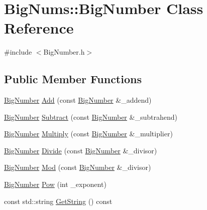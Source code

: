 \hypertarget{class_big_nums_1_1_big_number}{}\section{Big\+Nums\+::Big\+Number Class Reference}
\label{class_big_nums_1_1_big_number}


{\ttfamily \#include $<$Big\+Number.\+h$>$}

\subsection*{Public Member Functions}
\begin{DoxyCompactItemize}
\item 
\mbox{\hyperlink{class_big_nums_1_1_big_number}{Big\+Number}} \mbox{\hyperlink{class_big_nums_1_1_big_number_aead85993ce069442f7b15cca8c81df39}{Add}} (const \mbox{\hyperlink{class_big_nums_1_1_big_number}{Big\+Number}} \&\+\_\+addend)
\item 
\mbox{\hyperlink{class_big_nums_1_1_big_number}{Big\+Number}} \mbox{\hyperlink{class_big_nums_1_1_big_number_a505eed1769193372c05a1c41ae0e707b}{Subtract}} (const \mbox{\hyperlink{class_big_nums_1_1_big_number}{Big\+Number}} \&\+\_\+subtrahend)
\item 
\mbox{\hyperlink{class_big_nums_1_1_big_number}{Big\+Number}} \mbox{\hyperlink{class_big_nums_1_1_big_number_a7d54b0defb30727ab99a110b1b6c07ff}{Multiply}} (const \mbox{\hyperlink{class_big_nums_1_1_big_number}{Big\+Number}} \&\+\_\+multiplier)
\item 
\mbox{\hyperlink{class_big_nums_1_1_big_number}{Big\+Number}} \mbox{\hyperlink{class_big_nums_1_1_big_number_a55f83d787d248c55d9df8347c2fcb7ed}{Divide}} (const \mbox{\hyperlink{class_big_nums_1_1_big_number}{Big\+Number}} \&\+\_\+divisor)
\item 
\mbox{\hyperlink{class_big_nums_1_1_big_number}{Big\+Number}} \mbox{\hyperlink{class_big_nums_1_1_big_number_a1d7839794fa1b9dd285e017443d1859a}{Mod}} (const \mbox{\hyperlink{class_big_nums_1_1_big_number}{Big\+Number}} \&\+\_\+divisor)
\item 
\mbox{\hyperlink{class_big_nums_1_1_big_number}{Big\+Number}} \mbox{\hyperlink{class_big_nums_1_1_big_number_a3b66caf45f60c11461d9f747c2245aa2}{Pow}} (int \+\_\+exponent)
\item 
const std\+::string \mbox{\hyperlink{class_big_nums_1_1_big_number_a1f81565a354b88000e6fa6657bd138c6}{Get\+String}} () const
\item 

\end{DoxyCompactItemize}
